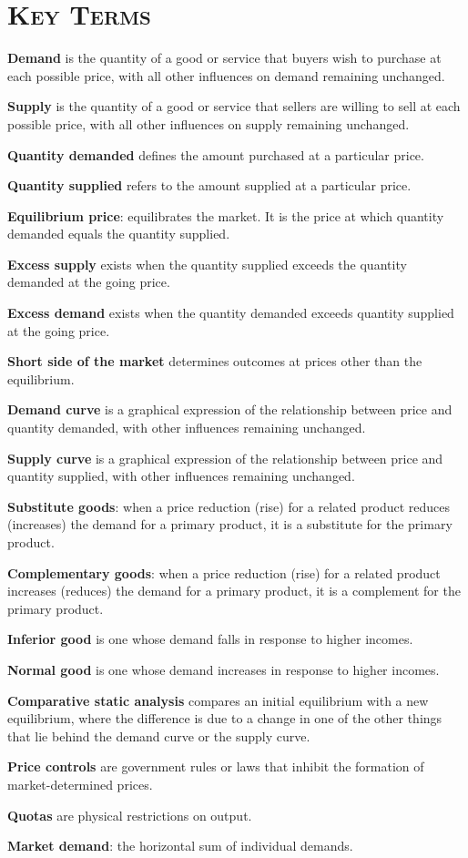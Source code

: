 \newpage
{}
	\section*{\textsc{Key Terms}}
\begin{keyterms}
\textbf{Demand} is the quantity of a good or service that buyers wish to purchase at each possible price, with all other influences on demand remaining unchanged.

\textbf{Supply} is the quantity of a good or service that sellers are willing to sell at each possible price, with all other influences on supply remaining unchanged.

\textbf{Quantity demanded} defines the amount purchased at a particular price.

\textbf{Quantity supplied} refers to the amount supplied at a particular price.

\textbf{Equilibrium price}: equilibrates the market. It is the price at which quantity demanded equals the quantity supplied.

\textbf{Excess supply} exists when the quantity supplied exceeds the quantity demanded at the going price.

\textbf{Excess demand} exists when the quantity demanded exceeds quantity supplied at the going price.

\textbf{Short side of the market} determines outcomes at prices other than the equilibrium.

\textbf{Demand curve} is a graphical expression of the relationship between price and quantity demanded, with other influences remaining unchanged.

\textbf{Supply curve} is a graphical expression of the relationship between price and quantity supplied, with other influences remaining unchanged.

\textbf{Substitute goods}: when a price reduction (rise) for a related product reduces (increases) the demand for a primary product, it is a substitute for the primary product.

\textbf{Complementary goods}: when a price reduction (rise) for a related product increases (reduces) the demand for a primary product, it is a complement for the primary product.

\textbf{Inferior good} is one whose demand falls in response to higher incomes.

\textbf{Normal good} is one whose demand increases in response to higher incomes.

\textbf{Comparative static analysis} compares an initial equilibrium with a new equilibrium, where the difference is due to a change in one of the other things that lie behind the demand curve or the supply curve.

\textbf{Price controls} are government rules or laws that inhibit the formation of market-determined prices.

\textbf{Quotas} are physical restrictions on output.

\textbf{Market demand}: the horizontal sum of individual demands.
\end{keyterms}